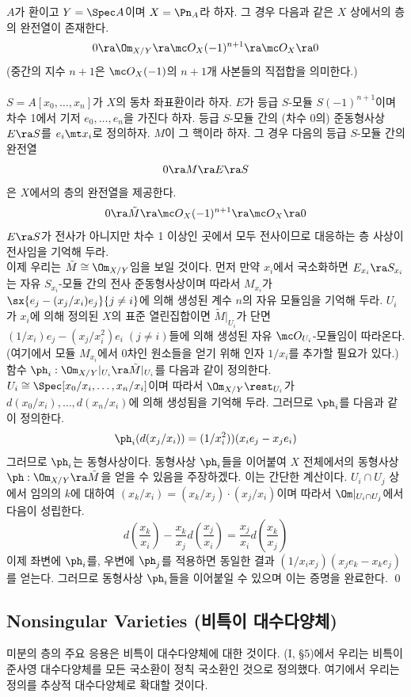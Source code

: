 	
	\begin{theorem}
	$A$가 환이고 $Y=\Spec A$이며 $X=\Pn_A$라 하자. 그 경우 다음과 같은 $X$ 상에서의 층의 완전열이 존재한다.
	$$0\ra\Om_{X/Y}\ra\mc O_X(-1)^{n+1}\ra\mc O_X\ra 0$$
	(중간의 지수 $n+1$은 $\mc O_X(-1)$의 $n+1$개 사본들의 직접합을 의미한다.)\\\\
	\pf $S=A[x_0,\ldots,x_n]$가 $X$의 동차 좌표환이라 하자.
	$E$가 등급 $S$-모듈 $S(-1)^{n+1}$이며 차수 1에서 기저 $e_0,\ldots,e_n$을 가진다 하자.
	등급 $S$-모듈 간의 (차수 0의) 준동형사상 $E\ra S$를 $e_i\mt x_i$로 정의하자. $M$이 그 핵이라 하자.
	그 경우 다음의 등급 $S$-모듈 간의 완전열
	$$0\ra M\ra E\ra S$$
	은 $X$에서의 층의 완전열을 제공한다.
	$$0\ra\tilde M\ra\mc O_X(-1)^{n+1}\ra\mc O_X\ra 0$$
	$E\ra S$가 전사가 아니지만 차수 1 이상인 곳에서 모두 전사이므로 대응하는 층 사상이 전사임을 기억해 두라.\\
	이제 우리는 $\tilde M\cong\Om_{X/Y}$임을 보일 것이다.
	먼저 만약 $x_i$에서 국소화하면 $E_{x_i}\ra S_{x_i}$는 자유 $S_{x_i}$-모듈 간의 전사 준동형사상이며
	따라서 $M_{x_i}$가 $\sx{e_j-(x_j/x_i)e_j}{j\ne i}$에 의해 생성된 계수 $n$의 자유 모듈임을 기억해 두라.
	$U_i$가 $x_i$에 의해 정의된 $X$의 표준 열린집합이면
	$\tilde M|_{U_i}$가 단면 $(1/x_i)e_j-(x_j/x_i^2)e_i\;(j\ne i)$들에 의해 생성된 자유 $\mc O_{U_i}$-모듈임이 따라온다.
	(여기에서 모듈 $M_{x_i}$에서 0차인 원소들을 얻기 위해 인자 $1/x_i$를 추가할 필요가 있다.)\\
	함수 $\ph_i:\Om_{X/Y}|_{U_i}\ra\tilde M|_{U_i}$를 다음과 같이 정의한다.
	$U_i\cong\Spec[x_0/x_i,\ldots,x_n/x_i]$이며
	따라서 $\Om_{X/Y}\rest_{U_i}$가 $d(x_0/x_i),\ldots,d(x_n/x_i)$에 의해 생성됨을 기억해 두라.
	그러므로 $\ph_i$를 다음과 같이 정의한다.
	$$\ph_i(d(x_j/x_i))=(1/x_i^2))(x_ie_j-x_je_i)$$
	그러므로 $\ph_i$는 동형사상이다. 동형사상 $\ph_i$들을 이어붙여
	$X$ 전체에서의 동형사상 $\ph:\Om_{X/Y}\ra\tilde M$을 얻을 수 있음을 주장하겠다.
	이는 간단한 계산이다. $U_i\cap U_j$ 상에서 임의의 $k$에 대하여 $(x_k/x_i)=(x_k/x_j)\cdot(x_j/x_i)$이며
	따라서 $\Om|_{U_i\cap U_j}$에서 다음이 성립한다.
	$$d\left(\frac{x_k}{x_i}\right)-\frac{x_k}{x_j}d\left(\frac{x_j}{x_i}\right)=\frac{x_j}{x_i}d\left(\frac{x_k}{x_j}\right)$$
	이제 좌변에 $\ph_i$를, 우변에 $\ph_j$를 적용하면 동일한 결과 $(1/x_ix_j)(x_je_k-x_ke_j)$를 얻는다.
	그러므로 동형사상 $\ph_i$들을 이어붙일 수 있으며 이는 증명을 완료한다.
	\qed
	\end{theorem}
	
	
	\subsection*{Nonsingular Varieties (비특이 대수다양체)}
	미분의 층의 주요 응용은 비특이 대수다양체에 대한 것이다.
	(I, \S 5)에서 우리는 비특이 준사영 대수다양체를 모든 국소환이 정칙 국소환인 것으로 정의했다.
	여기에서 우리는 정의를 추상적 대수다양체로 확대할 것이다.
	
